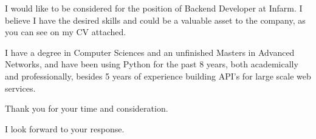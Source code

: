 \documentclass[10pt,stdletter,dateno,sigleft]{newlfm} %
\begin{document}
\begin{newlfm}


I would like to be considered for the position of Backend Developer at Infarm. I believe I have the
desired skills and could be a valuable asset to the company, as you can see on my CV attached.

I have a degree in Computer Sciences and an unfinished Masters in Advanced Networks,
and have been using Python for the past 8 years, both academically and professionally,
besides 5 years of experience building API's for large scale web services.

Thank you for your time and consideration.

I look forward to your response.


\end{newlfm}
\end{document}
